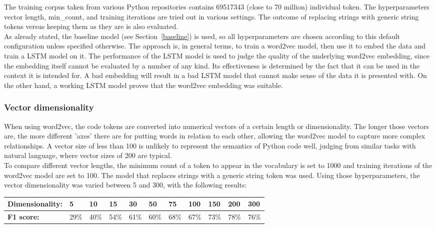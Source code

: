\documentclass[
a4paper,
pagesize,
pdftex,
12pt,
ngerman,
fleqn,
final,
]{scrartcl}
\begin{document}
	The training corpus taken from various Python repositories contains 69517343 (close to 70 million) individual token. The hyperparameters vector length, min\_count, and training iterations are tried out in various settings. The outcome of replacing strings with generic string tokens versus keeping them as they are is also evaluated.\\
	As already stated, the baseline model (see Section~\ref{baseline}) is used, so all hyperparameters are chosen according to this default configuration unless specified otherwise. The approach is, in general terms, to train a word2vec model, then use it to embed the data and train a LSTM model on it. The performance of the LSTM model is used to judge the quality of the underlying word2vec embedding, since the embedding itself cannot be evaluated by a number of any kind. Its effectiveness is determined by the fact that it can be used in the context it is intended for. A bad embedding will result in a bad LSTM model that cannot make sense of the data it is presented with. On the other hand, a working LSTM model proves that the word2vec embedding was suitable.
	
	\subsubsection{Vector dimensionality}
	When using word2vec, the code tokens are converted into numerical vectors of a certain length or dimensionality. The longer those vectors are, the more different 'axes' there are for putting words in relation to each other, allowing the word2vec model to capture more complex relationships. A vector size of less than 100 is unlikely to represent the semantics of Python code well, judging from similar tasks with natural language, where vector sizes of 200 are typical.\\
	To compare different vector lengths, the minimum count of a token to appear in the vocabulary is set to 1000 and training iterations of the word2vec model are set to 100. The model that replaces strings with a generic string token was used. Using those hyperparameters, the vector dimensionality was varied between 5 and 300, with the following results:	
	
	\begin{tabular}{| p{3.5cm}  | p{0.6cm} | p{0.6cm} | p{0.6cm} | p{0.6cm} | p{0.6cm} | p{0.6cm} | p{0.8cm} | p{0.8cm} | p{0.8cm} | p{0.8cm} | }
		\hline
		\textbf{Dimensionality:} & 5 & 10 & 15 & 30 & 50 & 75 & 100 & 150 & 200 & 300 \\
		\hline
		
		\textbf{F1 score:} & 29\% & 40\% & 54\% & 61\% & 60\% & 68\% & 67\% & 73\% & 78\% & 76\% \\
		\hline
		\hline
	\end{tabular}
	
\end{document}
